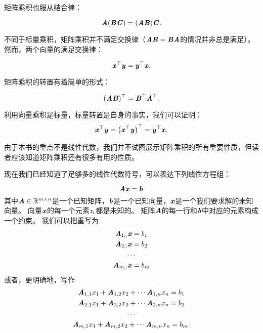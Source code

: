 矩阵乘积也服从结合律：


\begin{equation}
\MA(\MB\MC)=(\MA\MB)\MC.
\end{equation}




不同于标量乘积，矩阵乘积并不满足交换律（$\MA\MB=\MB\MA$的情况并非总是满足）。
然而，两个向量的满足交换律：


\begin{equation}
\label{eq:2.8}
\Vx^\top\Vy=\Vy^\top\Vx.
\end{equation}


矩阵乘积的转置有着简单的形式：


\begin{equation}
(\MA\MB)^\top=\MB^\top\MA^\top.
\end{equation}


利用向量乘积是标量，标量转置是自身的事实，我们可以证明：
\begin{equation}
    \Vx^\top \Vy = \left(\Vx^\top \Vy \right)^\top = \Vy^\top \Vx.
\end{equation}


由于本书的重点不是线性代数，我们并不试图展示矩阵乘积的所有重要性质，但读者应该知道矩阵乘积还有很多有用的性质。


现在我们已经知道了足够多的线性代数符号，可以表达下列线性方程组：


\begin{equation}
\label{eq:2.11}
\MA\Vx=\Vb
\end{equation}
其中$\MA\in \SetR^{m\times n}$是一个已知矩阵，$\Vb$是一个已知向量，$\Vx$是一个我们要求解的未知向量。
向量$\Vx$的每一个元素$\Sx_i$都是未知的。
矩阵$\MA$的每一行和$\Vb$中对应的元素构成一个约束。
我们可以把重写为
\begin{gather}
\MA_{1,:}\Vx=b_1\\
\MA_{2,:}\Vx=b_2 \\
\cdots \\
\MA_{m,:}\Vx=b_m
\end{gather}
或者，更明确地，写作
\begin{gather}
    \MA_{1,1}x_1+\MA_{1,2}x_2+\cdots \MA_{1,n}x_n = b_1\\
    \MA_{2,1}x_1+\MA_{2,2}x_2+\cdots \MA_{2,n}x_n = b_2\\
    \cdots\\
    \MA_{m,1}x_1+\MA_{m,2}x_2+\cdots \MA_{m,n}x_n = b_m.
\end{gather}


